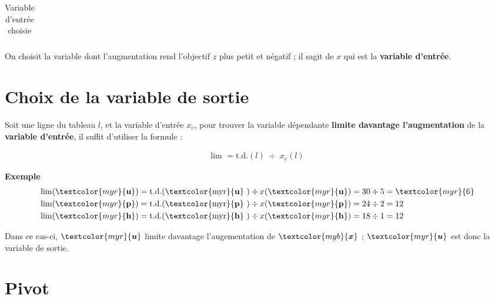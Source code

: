 \documentclass{report}
\begin{document}
\begin{multicols*}{2}
\begin{table}[H]
\begin{center}
\begin{tabular}{|l|l l l l l |l|l|}
                        \end{tabular}
                \end{center}
        \caption{Variable d'entrée choisie}
        \end{table}         
 On choisit la variable dont l'augmentation rend l'objectif $z$ 
plus petit et négatif ; il sagit de \textcolor{myr}{\textbf{$x$ }} qui 
est la \textcolor{myb}{\textbf{variable d'entrée}}.


\section{Choix de la variable de sortie}
Soit une ligne du tableau $l$, et la variable d'entrée 
$x_e$, pour trouver la variable dépendante 
\textbf{limite davantage l'augmentation} de la 
\textcolor{myb}{\textbf{variable d'entrée}}, il suffit d'utiliser la formule  : 


\begin{align*}
    \boxed{\text{lim } = \text{t.d.}(l) \; \div \; x_e(l)}
\end{align*}


\noindent
\textbf{Exemple} 
\begin{align*}
    &\text{lim}(\textcolor{myr}{\textbf{u}} ) = 
    \text{t.d.(\textcolor{myr}{\textbf{u}} )} \div 
    x(\textcolor{myr}{\textbf{u}} ) = 30 \div 5 = \textcolor{myr}{6}
    \\
    &\text{lim}(\textcolor{myr}{\textbf{p}} ) = 
    \text{t.d.(\textcolor{myr}{\textbf{p}} )} \div 
    x(\textcolor{myr}{\textbf{p}} ) = 24 \div 2 = 12 
    \\
    &\text{lim}(\textcolor{myr}{\textbf{h}} ) = 
    \text{t.d.(\textcolor{myr}{\textbf{h}} )} \div 
    x(\textcolor{myr}{\textbf{h}} ) = 18 \div 1 = 12 
\end{align*}

Dans ce cas-ci, $\textcolor{myr}{\boldsymbol{u}}$ limite davantage l'augementation de 
$\textcolor{myb}{\boldsymbol{x}}$ ; $\textcolor{myr}{\boldsymbol{u}}$ est donc la variable de sortie.

\section{Pivot}


\end{multicols*}
\end{document}
